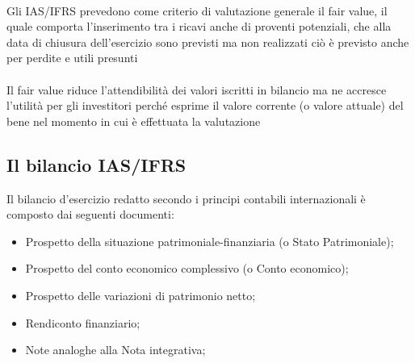 \documentclass{report}
\begin{document}
\\
Gli IAS/IFRS prevedono come criterio di valutazione generale il fair value, il quale comporta l'inserimento tra i ricavi anche di proventi potenziali, che alla data di chiusura dell'esercizio sono previsti ma non realizzati ciò è previsto anche per perdite e utili presunti
\\
\\
Il fair value riduce l'attendibilità dei valori iscritti in bilancio ma ne accresce l'utilità per gli investitori perché esprime il valore corrente (o valore attuale) del bene nel momento in cui è effettuata la valutazione

\subsection{Il bilancio IAS/IFRS} %
\label{sub:Il bilancio IAS/IFRS}
Il bilancio d'esercizio redatto secondo i principi contabili internazionali è composto dai seguenti documenti:
\\
\begin{itemize}
  \item{Prospetto della situazione patrimoniale-finanziaria (o Stato Patrimoniale);}
  \item{Prospetto del conto economico complessivo (o Conto economico);}
  \item{Prospetto delle variazioni di patrimonio netto;}
  \item{Rendiconto finanziario;}
  \item{Note analoghe alla Nota integrativa;}
\end{itemize}

\end{document}
